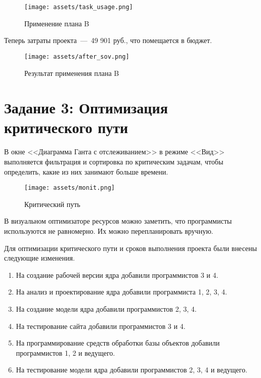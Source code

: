 \begin{figure}[H]
    \begin{center}
    \texttt{[image: assets/task\_usage.png]}
    \caption{Применение плана B}
    \label{fig:2}
    \end{center}
\end{figure}

Теперь затраты проекта~---~49 901 руб., что помещается в бюджет.

\begin{figure}[H]
    \begin{center}
    \texttt{[image: assets/after\_sov.png]}
    \caption{Результат применения плана B}
    \label{fig:2}
    \end{center}
\end{figure}

\section{Задание 3: Оптимизация критического пути}

В окне <<Диаграмма Ганта с отслеживанием>> в режиме <<Вид>> выполняется фильтрация и сортировка по критическим задачам, чтобы определить, какие из них занимают больше времени.

\begin{figure}[H]
    \begin{center}
    \texttt{[image: assets/monit.png]}
    \caption{Критический путь}
    \label{fig:2}
    \end{center}
\end{figure}

В визуальном оптимизаторе ресурсов можно заметить, что программисты используются не равномерно. Их можно перепланировать вручную.

Для оптимизации критического пути и сроков выполнения проекта были внесены следующие изменения.

\begin{enumerate}
	\item На создание рабочей версии ядра добавили программистов 3 и 4.
	\item На анализ и проектирование ядра добавили программиста 1, 2, 3, 4.
	\item На создание модели ядра добавили программистов 2, 3, 4.
	\item На тестирование сайта добавили программистов 3 и 4.
	\item На программирование средств обработки базы объектов добавили программистов 1, 2 и ведущего.
	\item На тестирование модели ядра добавили программистов 2, 3, 4 и ведущего.
\end{enumerate}

